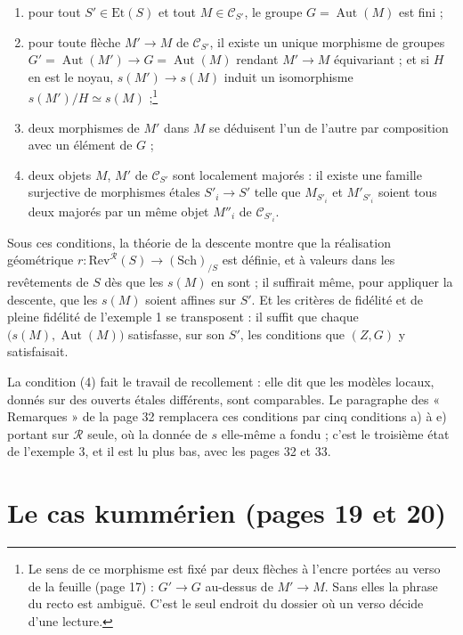 \documentclass[11pt,a4paper]{article}
\begin{document}
\begin{enumerate}
  \item[(1)] pour tout $S' \in \mathrm{Et}(S)$ et tout
    $M \in \mathcal{C}_{S'}$, le groupe $G = \operatorname{Aut}(M)$ est fini ;
  \item[(2)] pour toute flèche $M' \to M$ de $\mathcal{C}_{S'}$, il existe un
    unique morphisme de groupes $G' = \operatorname{Aut}(M') \to
    G = \operatorname{Aut}(M)$ rendant $M' \to M$ équivariant ; et si $H$ en est
    le noyau, $s(M') \to s(M)$ induit un isomorphisme
    $s(M')/H \simeq s(M)$ ;\footnote{Le sens de ce morphisme est fixé par deux
    flèches à l'encre portées au verso de la feuille (page 17) :
    $G' \to G$ au-dessus de $M' \to M$. Sans elles la phrase du recto est
    ambiguë. C'est le seul endroit du dossier où un verso décide d'une lecture.}
  \item[(3)] deux morphismes de $M'$ dans $M$ se déduisent l'un de l'autre par
    composition avec un élément de $G$ ;
  \item[(4)] deux objets $M$, $M'$ de $\mathcal{C}_{S'}$ sont localement
    majorés : il existe une famille surjective de morphismes étales
    $S'_{i} \to S'$ telle que $M_{S'_{i}}$ et $M'_{S'_{i}}$ soient tous deux
    majorés par un même objet $M''_{i}$ de $\mathcal{C}_{S'_{i}}$.
\end{enumerate}

Sous ces conditions, la théorie de la descente montre que la réalisation
géométrique $r : \mathrm{Rev}^{\mathcal{R}}(S) \to (\mathrm{Sch})_{/S}$ est
définie, et à valeurs dans les revêtements de $S$ dès que les $s(M)$ en sont ;
il suffirait même, pour appliquer la descente, que les $s(M)$ soient
affines sur $S'$. Et les critères de fidélité et de pleine fidélité de
l'exemple 1 se transposent : il suffit que chaque
$\bigl(s(M), \operatorname{Aut}(M)\bigr)$ satisfasse, sur son $S'$, les
conditions que $(Z,G)$ y satisfaisait.

La condition (4) fait le travail de recollement : elle
dit que les modèles locaux, donnés sur des ouverts étales différents, sont
comparables. Le paragraphe des « Remarques » de la page 32 remplacera ces
conditions par cinq conditions a) à e) portant sur $\mathcal{R}$ seule, où la
donnée de $s$ elle-même a fondu ; c'est le troisième état de l'exemple 3, et il
est lu plus bas, avec les pages 32 et 33.

\section*{Le cas kummérien (pages 19 et 20)}
\end{document}
